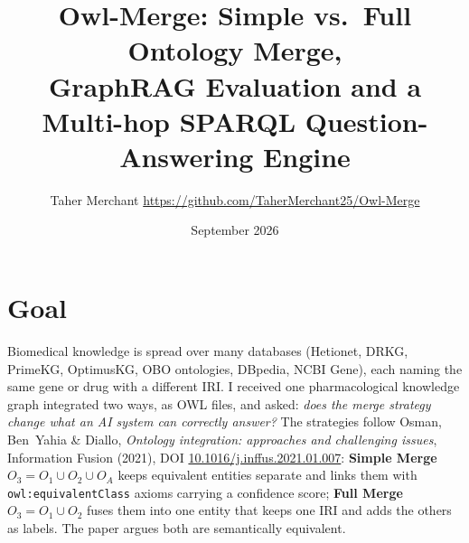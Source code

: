\documentclass[10pt,a4paper]{article}
\title{\vspace{-1.2cm}\textbf{Owl-Merge: Simple vs.\ Full Ontology Merge,\\ GraphRAG Evaluation and a Multi-hop SPARQL Question-Answering Engine}}
\author{Taher Merchant \quad\small\url{https://github.com/TaherMerchant25/Owl-Merge}}
\date{September 2026}
\newcommand{\code}[1]{\texttt{\small #1}}
\begin{document}
\maketitle
\vspace{-0.9cm}

\section{Goal}
Biomedical knowledge is spread over many databases (Hetionet, DRKG, PrimeKG, OptimusKG, OBO ontologies, DBpedia, NCBI Gene), each naming the same gene or drug with a different IRI.
I received one pharmacological knowledge graph integrated two ways, as OWL files, and asked: \emph{does the merge strategy change what an AI system can correctly answer?}
The strategies follow Osman, Ben~Yahia \& Diallo, \emph{Ontology integration: approaches and challenging issues}, Information Fusion (2021), DOI \href{https://doi.org/10.1016/j.inffus.2021.01.007}{10.1016/j.inffus.2021.01.007}:
\textbf{Simple Merge} $O_3 = O_1 \cup O_2 \cup O_A$ keeps equivalent entities separate and links them with \code{owl:equivalentClass} axioms carrying a confidence score;
\textbf{Full Merge} $O_3 = O_1 \cup O_2$ fuses them into one entity that keeps one IRI and adds the others as labels. The paper argues both are semantically equivalent.
\end{document}
